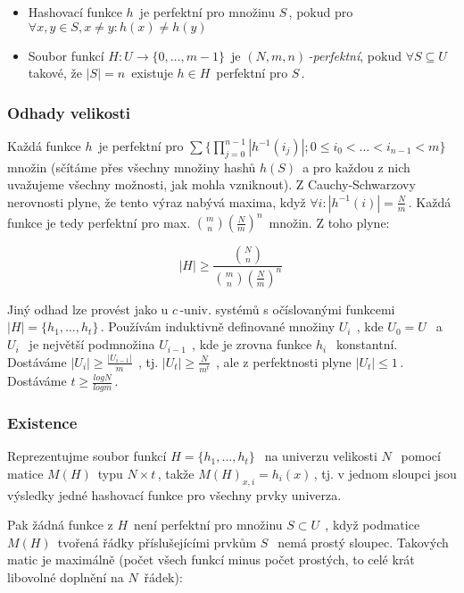 \begin{itemize}
\tightlist
\item
  Hashovací funkce \(h\,\!\) je perfektní pro množinu \(S\,\!\), pokud
  pro \(\forall x,y\in S, x\neq y: h(x)\neq h(y)\,\!\)
\item
  Soubor funkcí \(H:U\to \{0,\dots,m-1\}\,\!\) je
  \((N,m,n)\,\!\)\emph{-perfektní}, pokud \(\forall S\subseteq U\,\!\)
  takové, že \(|S|=n\,\!\) existuje \(h\in H\,\!\) perfektní pro
  \(S\,\!\).
\end{itemize}

\subsubsection{Odhady velikosti}\label{odhady-velikosti}

Každá funkce \(h\,\!\) je perfektní pro
\(\sum\{\prod_{j=0}^{n-1}|h^{-1}(i_j)|;0\leq i_0<\dots<i_{n-1}<m\}\,\!\)
množin (sčítáme přes všechny množiny hashů \(h(S)\,\!\) a pro každou z
nich uvažujeme všechny možnosti, jak mohla vzniknout). Z
Cauchy-Schwarzovy nerovnosti plyne, že tento výraz nabývá maxima, když
\(\forall i: |h^{-1}(i)|=\frac{N}{m}\,\!\). Každá funkce je tedy
perfektní pro max. \(\mathbf{}\binom{m}{n}(\frac{N}{m})^n\,\!\) množin.
Z toho plyne:

\[|H|\geq \frac{\mathbf{}\binom{N}{n}}{\mathbf{}\binom{m}{n}\left(\frac{N}{m}\right)^n}\,\!\]

Jiný odhad lze provést jako u \(c\,\!\)-univ. systémů s očíslovanými
funkcemi \(|H|=\{h_1,\dots,h_t\}\,\!\). Používám induktivně definované
množiny \(U_i\,\;\), kde \(U_0 = U\,\;\) a \(U_i\,\;\) je největší
podmnožina \(U_{i-1}\,\;\), kde je zrovna funkce \(h_i\,\;\) konstantní.
Dostáváme \(|U_i|\geq \frac{|U_{i-1}|}{m}\,\;\), tj.
\(|U_t| \geq \frac{N}{m^t}\,\;\), ale z perfektnosti plyne
\(|U_t|\leq 1\,\!\). Dostáváme \(t\geq \frac{log N}{log m}\,\!\).

\subsubsection{Existence}\label{existence}

Reprezentujme soubor funkcí \(H=\{h_1,\dots,h_t\}\,\;\) na univerzu
velikosti \(N\,\;\) pomocí matice \(M(H)\,\!\) typu \(N\times t\,\!\),
takže \(M(H)_{x,i}=h_i(x)\,\!\), tj. v jednom sloupci jsou výsledky
jedné hashovací funkce pro všechny prvky univerza.

Pak žádná funkce z \(H\,\!\) není perfektní pro množinu
\(S\subset U\,\;\), když podmatice \(M(H)\,\!\) tvořená řádky
příslušejícími prvkům \(S\,\;\) nemá prostý sloupec. Takových matic je
maximálně (počet všech funkcí minus počet prostých, to celé krát
libovolné doplnění na \(N\,\!\) řádek):

